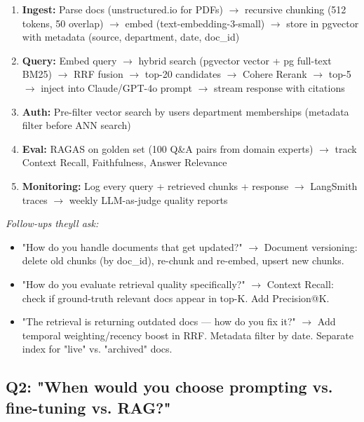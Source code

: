 \documentclass[11pt]{article}
\providecommand{\tightlist}{\setlength{\itemsep}{1pt}\setlength{\parskip}{0pt}}
\begin{document}
\begin{enumerate}
\def\labelenumi{\arabic{enumi}.}
\tightlist
\item
  \textbf{Ingest:} Parse docs (unstructured.io for PDFs) \(\rightarrow\) recursive chunking (512 tokens, 50 overlap) \(\rightarrow\) embed (text-embedding-3-small) \(\rightarrow\) store in pgvector with metadata (source, department, date, doc\_id)
\item
  \textbf{Query:} Embed query \(\rightarrow\) hybrid search (pgvector vector + pg full-text BM25) \(\rightarrow\) RRF fusion \(\rightarrow\) top-20 candidates \(\rightarrow\) Cohere Rerank \(\rightarrow\) top-5 \(\rightarrow\) inject into Claude/GPT-4o prompt \(\rightarrow\) stream response with citations
\item
  \textbf{Auth:} Pre-filter vector search by user\textquotesingle s department memberships (metadata filter before ANN search)
\item
  \textbf{Eval:} RAGAS on golden set (100 Q\&A pairs from domain experts) \(\rightarrow\) track Context Recall, Faithfulness, Answer Relevance
\item
  \textbf{Monitoring:} Log every query + retrieved chunks + response \(\rightarrow\) LangSmith traces \(\rightarrow\) weekly LLM-as-judge quality reports
\end{enumerate}

\emph{Follow-ups they\textquotesingle ll ask:}

\begin{itemize}
\tightlist
\item
  "How do you handle documents that get updated?" \(\rightarrow\) Document versioning: delete old chunks (by doc\_id), re-chunk and re-embed, upsert new chunks.
\item
  "How do you evaluate retrieval quality specifically?" \(\rightarrow\) Context Recall: check if ground-truth relevant docs appear in top-K. Add Precision@K.
\item
  "The retrieval is returning outdated docs --- how do you fix it?" \(\rightarrow\) Add temporal weighting/recency boost in RRF. Metadata filter by date. Separate index for "live" vs. "archived" docs.
\end{itemize}

\subsection{Q2: "When would you choose prompting vs. fine-tuning vs. RAG?"}\label{q2-when-would-you-choose-prompting-vs-fine-tuning-vs-rag}
\end{document}
